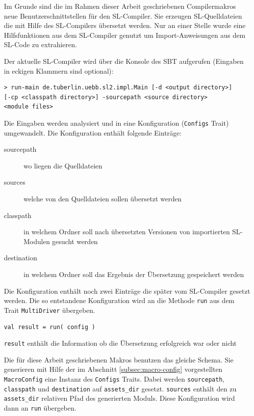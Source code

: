 \documentclass[12pt,bibtotoc]{scrreprt}
\begin{document}
Im Grunde sind die im Rahmen dieser Arbeit geschriebenen Compilermakros neue Benutzerschnittstellen für den SL-Compiler. Sie erzeugen SL-Quelldateien die mit Hilfe des SL-Compilers übersetzt werden. Nur an einer Stelle wurde eine Hilfsfunktionen aus dem SL-Compiler genutzt um Import-Anweisungen aus dem SL-Code zu extrahieren.

Der aktuelle SL-Compiler wird über die Konsole des \ac{SBT} aufgerufen (Eingaben in eckigen Klammern sind optional)\cite{TypeSave}\cite[S. 15f]{Bisping2013}:

\begin{lstlisting}
> run-main de.tuberlin.uebb.sl2.impl.Main [-d <output directory>]
[-cp <classpath directory>] -sourcepath <source directory>
<module files>
\end{lstlisting}

Die Eingaben werden analysiert und in eine Konfiguration (\lstinline!Configs! Trait) umgewandelt. Die Konfiguration enthält folgende Einträge:

\begin{description}
 \item[sourcepath]{wo liegen die Quelldateien}
 \item[sources]{welche von den Quelldateien sollen übersetzt werden}
 \item[classpath]{in welchem Ordner soll nach übersetzten Versionen von importierten SL-Modulen gesucht werden}
 \item[destination]{in welchem Ordner soll das Ergebnis der Übersetzung gespeichert werden}
\end{description}

Die Konfiguration enthält noch zwei Einträge die später vom SL-Compiler gesetzt werden. Die so entstandene Konfiguration wird an die Methode \lstinline!run! aus dem Trait \lstinline!MultiDriver! \cite[S. 16-19]{Bisping2013} übergeben.

\begin{centering}
\lstinline!val result = run( config )!\\
\end{centering}

\lstinline!result! enthält die Information ob die Übersetzung erfolgreich war oder nicht

Die für diese Arbeit geschriebenen Makros benutzen das gleiche Schema. Sie generieren mit Hilfe der im Abschnitt \ref{subsec:macro-config} vorgestellten \lstinline!MacroConfig! eine Instanz des \lstinline!Configs! Traits. Dabei werden \lstinline!sourcepath!, \lstinline!classpath! und \lstinline!destination! auf \lstinline!assets_dir! gesetzt. \lstinline!sources! enthält den zu \lstinline!assets_dir! relativen Pfad des generierten Moduls. Diese Konfiguration wird dann an \lstinline!run! übergeben.
\end{document}
